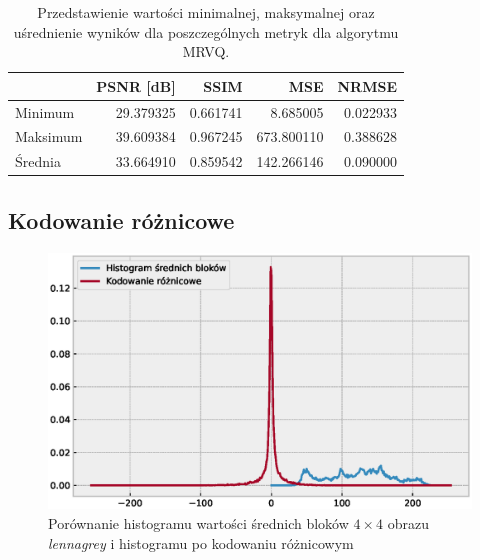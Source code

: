 \documentclass{article}
\begin{document}
\begin{table}[H]
  \caption{Przedstawienie wartości minimalnej, maksymalnej oraz uśrednienie wyników dla poszczególnych metryk dla algorytmu MRVQ.}
  \label{tab:mrvq_summary}
  \centering
  \begin{tabular}{@{}lrrrr@{}}
    \toprule
             & PSNR {[}dB{]} & SSIM     & MSE        & NRMSE    \\ \midrule
    Minimum  & 29.379325     & 0.661741 & 8.685005   & 0.022933 \\
    Maksimum & 39.609384     & 0.967245 & 673.800110 & 0.388628 \\
    Średnia  & 33.664910     & 0.859542 & 142.266146 & 0.090000 \\
    \bottomrule
  \end{tabular}
\end{table}

\FloatBarrier

\subsection{Kodowanie różnicowe}

\begin{figure}[H]
  \centering
  \includegraphics[width=.9\linewidth]{images/differential_encoding_histogram_image.eps}
  \caption{Porównanie histogramu wartości średnich bloków $4\times4$ obrazu \emph{lennagrey} i histogramu po kodowaniu różnicowym}
  \label{fig:de_histogram_image}
\end{figure}
\end{document}
